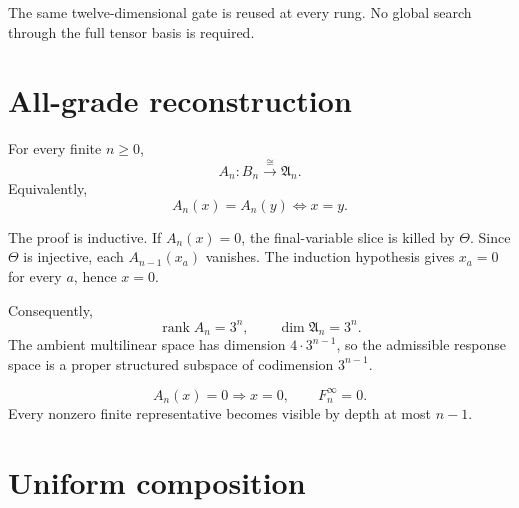 \documentclass[11pt,a4paper]{article}
\begin{document}
\begin{center}
\end{center}

The same twelve-dimensional gate is reused at every rung. No global search through the full tensor basis is required.

\section{All-grade reconstruction}

\begin{theorembox}
For every finite $n\ge0$,
\[
\boxed{
A_n:B_n\xrightarrow{\cong}\mathfrak A_n.
}
\]
Equivalently,
\[
\boxed{
A_n(x)=A_n(y)
\iff
x=y.
}
\]
\end{theorembox}

The proof is inductive. If $A_n(x)=0$, the final-variable slice is killed by $\Theta$. Since $\Theta$ is injective, each $A_{n-1}(x_a)$ vanishes. The induction hypothesis gives $x_a=0$ for every $a$, hence $x=0$.

Consequently,
\[
\operatorname{rank}A_n=3^n,
\qquad
\dim\mathfrak A_n=3^n.
\]
The ambient multilinear space has dimension $4\cdot3^{n-1}$, so the admissible response space is a proper structured subspace of codimension $3^{n-1}$.

\begin{resultbox}
\[
\boxed{
A_n(x)=0\Longrightarrow x=0,
\qquad
F_n^{\infty}=0.
}
\]
Every nonzero finite representative becomes visible by depth at most $n-1$.
\end{resultbox}

\section{Uniform composition}
\end{document}
